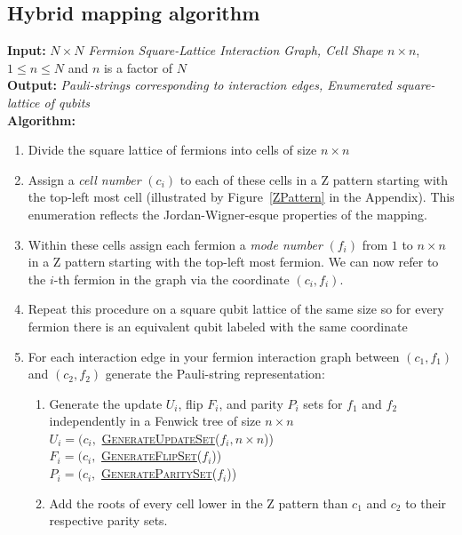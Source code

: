 \documentclass[pdftex,pra,aps,twocolumn,twoside]{revtex4-2}
\theoremstyle{plain}
\theoremstyle{note}
\newcommand\+{{\footnotesize \raisebox{0.3ex}{+}}}
\begin{document}
\subsection{Hybrid mapping algorithm}
\label{section:Hybridmapping}
\noindent
\textbf{Input:} \textit{$N\times N$ Fermion Square-Lattice Interaction Graph, Cell Shape $n \times n$}, $1\le n\le N$ and $n$ is a factor of $N$\\
\textbf{Output:} \textit{Pauli-strings corresponding to interaction edges, Enumerated square-lattice of qubits}\\
\textbf{Algorithm:}
\begin{enumerate}
    \item Divide the square lattice of fermions into cells of size $n \times n$
    \item Assign a \textit{cell number} $(c_i)$ to each of these cells in a Z pattern starting with the top-left most cell (illustrated by Figure~\ref{ZPattern} in the Appendix). 
    This enumeration reflects the Jordan-Wigner-esque properties of the mapping.
    \item Within these cells assign each fermion a \textit{mode number} $(f_i)$ from $1$ to $n\times n$ in a Z pattern starting with the top-left most fermion. We can now refer to the $i$-th fermion in the graph via the coordinate $(c_i, f_i)$.
    \item Repeat this procedure on a square qubit lattice of the same size so for every fermion there is an equivalent qubit labeled with the same coordinate
    \item For each interaction edge in your fermion interaction graph between $(c_1, f_1)$ and $(c_2, f_2)$ generate the Pauli-string representation:
    \begin{enumerate}
        \item Generate the update $U_i$, flip $F_i$, and parity $P_i$ sets for $f_1$ and $f_2$ independently in a Fenwick tree of size $n \times n$\\
        \textsc{$U_i = (c_i, $ \hyperref[GenerateUpdateSet]{GenerateUpdateSet}($f_i, n\times n$))}\\
        \textsc{$F_i = (c_i, $ \hyperref[GenerateFlipSet]{GenerateFlipSet}($f_i$))}\\
        \textsc{$P_i = (c_i, $ \hyperref[GenerateParitySet]{GenerateParitySet}($f_i$))}
        \item Add the roots of every cell lower in the Z pattern than $c_1$ and $c_2$ to their respective parity sets. \\

\end{enumerate}
\end{enumerate}
\end{document}
